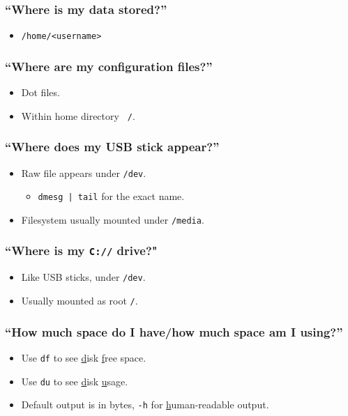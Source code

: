\documentclass[xcolor={dvipsnames,svgnames},hyperref=dvips]{beamer}
\begin{document}
	\begin{frame}
		\frametitle{``Where is my data stored?''}
		\begin{itemize}
		\item \texttt{/home/<username>}
		\end{itemize}
	\end{frame}

	\begin{frame}
		\frametitle{``Where are my configuration files?''}
		\begin{itemize}
		\item Dot files.
		\item Within home directory \texttt{~/}.
		\end{itemize}
	\end{frame}

	\begin{frame}
		\frametitle{``Where does my USB stick appear?''}
		\begin{itemize}
		\item Raw file appears under \texttt{/dev}.
			\begin{itemize}
			\item \texttt{dmesg | tail} for the exact name.
			\end{itemize}
		\item Filesystem usually mounted under \texttt{/media}.
		\end{itemize}
	\end{frame}

	\begin{frame}
		\frametitle{``Where is my \texttt{C://} drive?"}
		\begin{itemize}
		\item Like USB sticks, under \texttt{/dev}.
		\item Usually mounted as root \texttt{/}.
		\end{itemize}
	\end{frame}

	\begin{frame}
		\frametitle{``How much space do I have/how much space am I using?''}
		\begin{itemize}
		\item Use \texttt{df} to see \underline{d}isk \underline{f}ree space.
		\item Use \texttt{du} to see \underline{d}isk \underline{u}sage.
		\item Default output is in bytes, \texttt{-h} for \underline{h}uman-readable output.
		\end{itemize}
	\end{frame}
\end{document}
